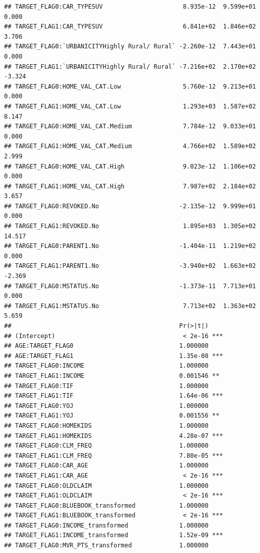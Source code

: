 \documentclass[
]{article}
\begin{document}
\begin{verbatim}
## TARGET_FLAG0:CAR_TYPESUV                      8.935e-12  9.599e+01   0.000
## TARGET_FLAG1:CAR_TYPESUV                      6.841e+02  1.846e+02   3.706
## TARGET_FLAG0:`URBANICITYHighly Rural/ Rural` -2.260e-12  7.443e+01   0.000
## TARGET_FLAG1:`URBANICITYHighly Rural/ Rural` -7.216e+02  2.170e+02  -3.324
## TARGET_FLAG0:HOME_VAL_CAT.Low                 5.760e-12  9.213e+01   0.000
## TARGET_FLAG1:HOME_VAL_CAT.Low                 1.293e+03  1.587e+02   8.147
## TARGET_FLAG0:HOME_VAL_CAT.Medium              7.784e-12  9.033e+01   0.000
## TARGET_FLAG1:HOME_VAL_CAT.Medium              4.766e+02  1.589e+02   2.999
## TARGET_FLAG0:HOME_VAL_CAT.High                9.023e-12  1.106e+02   0.000
## TARGET_FLAG1:HOME_VAL_CAT.High                7.987e+02  2.184e+02   3.657
## TARGET_FLAG0:REVOKED.No                      -2.135e-12  9.999e+01   0.000
## TARGET_FLAG1:REVOKED.No                       1.895e+03  1.305e+02  14.517
## TARGET_FLAG0:PARENT1.No                      -1.404e-11  1.219e+02   0.000
## TARGET_FLAG1:PARENT1.No                      -3.940e+02  1.663e+02  -2.369
## TARGET_FLAG0:MSTATUS.No                      -1.373e-11  7.713e+01   0.000
## TARGET_FLAG1:MSTATUS.No                       7.713e+02  1.363e+02   5.659
##                                              Pr(>|t|)    
## (Intercept)                                   < 2e-16 ***
## AGE:TARGET_FLAG0                             1.000000    
## AGE:TARGET_FLAG1                             1.35e-08 ***
## TARGET_FLAG0:INCOME                          1.000000    
## TARGET_FLAG1:INCOME                          0.001546 ** 
## TARGET_FLAG0:TIF                             1.000000    
## TARGET_FLAG1:TIF                             1.64e-06 ***
## TARGET_FLAG0:YOJ                             1.000000    
## TARGET_FLAG1:YOJ                             0.001556 ** 
## TARGET_FLAG0:HOMEKIDS                        1.000000    
## TARGET_FLAG1:HOMEKIDS                        4.28e-07 ***
## TARGET_FLAG0:CLM_FREQ                        1.000000    
## TARGET_FLAG1:CLM_FREQ                        7.80e-05 ***
## TARGET_FLAG0:CAR_AGE                         1.000000    
## TARGET_FLAG1:CAR_AGE                          < 2e-16 ***
## TARGET_FLAG0:OLDCLAIM                        1.000000    
## TARGET_FLAG1:OLDCLAIM                         < 2e-16 ***
## TARGET_FLAG0:BLUEBOOK_transformed            1.000000    
## TARGET_FLAG1:BLUEBOOK_transformed             < 2e-16 ***
## TARGET_FLAG0:INCOME_transformed              1.000000    
## TARGET_FLAG1:INCOME_transformed              1.52e-09 ***
## TARGET_FLAG0:MVR_PTS_transformed             1.000000    

\end{verbatim}
\end{document}
